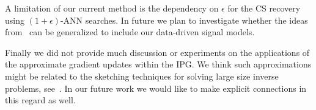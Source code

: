 A limitation of our current method is the dependency on $\epsilon$ for the CS recovery using $(1+ \epsilon)$-ANN searches. In future we plan to investigate whether the ideas from~\cite{Hegde15} can be generalized to include our data-driven signal models.

Finally we did not provide much discussion or experiments on the applications of the approximate gradient updates within the IPG. We think such approximations might be related to the sketching techniques for solving large size inverse problems, see~\cite{Pilanci:IHS, GPIS}.
In our future work we would like to make explicit connections  in this regard as well.





